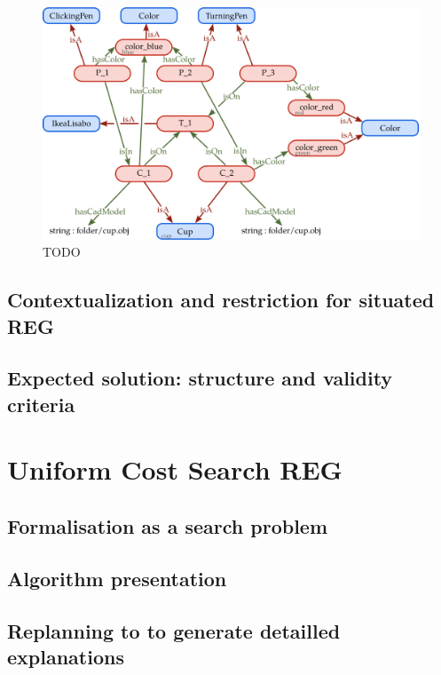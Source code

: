 \begin{figure}[h!]
\centering
\includegraphics[scale=0.38]{figures/chapter4/pens_Abox.png}
\caption{\label{fig:chap4_kb_Abox} TODO }
\end{figure}



\subsection{Contextualization and restriction for situated REG}

\subsection{Expected solution: structure and validity criteria}

\section{Uniform Cost Search REG}

\subsection{Formalisation as a search problem}

\subsection{Algorithm presentation}

\subsection{Replanning to to generate detailled explanations}

